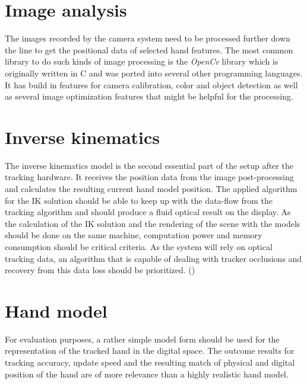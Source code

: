 \section{Image analysis}
The images recorded by the camera system need to be processed further down the line to get the positional data of selected hand features. The most common library to do such kinds of image processing is the \textit{OpenCv} library which is originally written in C and was ported into several other programming languages. It has build in features for camera calibration, color and object detection as well as several image optimization features that might be helpful for the processing.
\section{Inverse kinematics}
The inverse kinematics model is the second essential part of the setup after the tracking hardware. It receives the position data from the image post-processing and calculates the resulting current hand model position. The applied algorithm for the IK solution should be able to keep up with the data-flow from the tracking algorithm and should produce a fluid optical result on the display. As the calculation of the IK solution and the rendering of the scene with the models should be done on the same machine, computation power and memory consumption should be critical criteria. As the system will rely on optical tracking data, an algorithm that is capable of dealing with tracker occlusions and recovery from this data loss  should be prioritized. 
(\cite{Lansley.2016})
\section{Hand model}
For evaluation purposes, a rather simple model form should be used for the representation of the tracked hand in the digital space. The outcome results for tracking accuracy, update speed and the resulting match of physical and digital position of the hand are of more relevance than a highly realistic hand model.
 